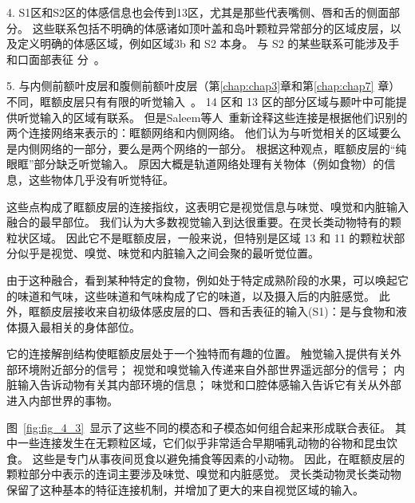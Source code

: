 4. S1区和S2区的体感信息也会传到13区，尤其是那些代表嘴侧\cite{pritchard1986projections}、唇和舌的侧面部分\cite{carmichael1994architectonic}。
这些联系包括不明确的体感诸如顶叶盖和岛叶颗粒异常部分的区域皮层\cite{saleem2008complementary}，以及定义明确的体感区域，例如区域3b 和 S2 本身。
与 S2 的某些联系可能涉及手和口面部表征 分~\cite{carmichael1994architectonic}。\par


5. 与内侧前额叶皮层和腹侧前额叶皮层（第\ref{chap:chap3}章和第\ref{chap:chap7} 章）不同，眶额皮层只有有限的听觉输入~\cite{saleem2008complementary}。
14 区和 13 区的部分区域与颞叶中可能提供听觉输入的区域有联系\cite{petrides1996specialized}。
但是Saleem等人~\cite{saleem2008complementary}重新诠释这些连接是根据他们识别的两个连接网络来表示的：眶额网络和内侧网络。
他们认为与听觉相关的区域要么是内侧网络的一部分，要么是两个网络的一部分。
根据这种观点，眶额皮层的“纯眼眶”部分缺乏听觉输入。
原因大概是轨道网络处理有关物体（例如食物）的信息，这些物体几乎没有听觉特征。\par


这些点构成了眶额皮层的连接指纹，这表明它是视觉信息与味觉、嗅觉和内脏输入融合的最早部位。
我们认为大多数视觉输入到达很重要。在灵长类动物特有的颗粒状区域。
因此它不是眶额皮层，一般来说，但特别是区域 13 和 11 的颗粒状部分似乎是视觉、嗅觉、味觉和内脏输入之间会聚的最听觉位置。\par


由于这种融合，看到某种特定的食物，例如处于特定成熟阶段的水果，可以唤起它的味道和气味，这些味道和气味构成了它的味道，以及摄入后的内脏感觉。
此外，眶额皮层接收来自初级体感皮层的口、唇和舌表征的输入(S1)：是与食物和液体摄入最相关的身体部位\cite{carmichael1995sensory}。\par


它的连接解剖结构使眶额皮层处于一个独特而有趣的位置。
触觉输入提供有关外部环境附近部分的信号；
视觉和嗅觉输入传递来自外部世界遥远部分的信号；
内脏输入告诉动物有关其内部环境的信息；
味觉和口腔体感输入告诉它有关从外部进入内部世界的事物。\par


图~\ref{fig:fig_4_3}~显示了这些不同的模态和子模态如何组合起来形成联合表征。
其中一些连接发生在无颗粒区域，它们似乎非常适合早期哺乳动物的谷物和昆虫饮食。
这些是专门从事夜间觅食以避免捕食等因素的小动物。
因此，在眶额皮层的颗粒部分中表示的连词主要涉及味觉、嗅觉和内脏感觉。
灵长类动物灵长类动物保留了这种基本的特征连接机制，并增加了更大的来自视觉区域的输入。\par


